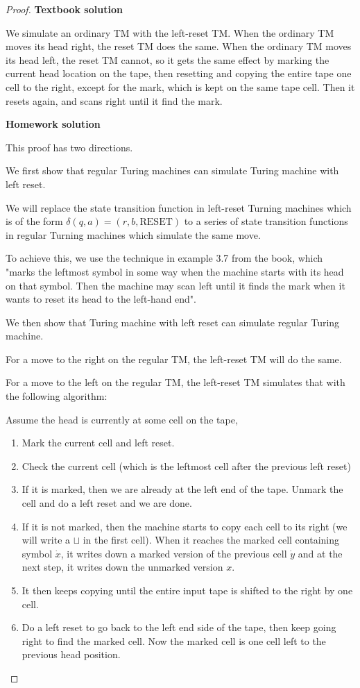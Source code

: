 \begin{mdframed}
\begin{proof}
\textbf{Textbook solution}

We simulate an ordinary TM with the left-reset TM. When the ordinary TM moves its head right, the reset TM does the same. When the ordinary TM moves its head left, the reset TM cannot, so it gets the same effect by marking the current head location on the tape, then resetting and copying the entire tape one cell to the right, except for the mark, which is kept on the same tape cell. Then it resets again, and scans right until it find the mark.

\textbf{Homework solution}

This proof has two directions.

\medskip
We first show that regular Turing machines can simulate Turing machine with left reset.

We will replace the state transition function in left-reset Turning machines which is of the form 
$\delta(q, a) = (r, b, \text{RESET})$ to a series of state transition functions in regular Turning machines which simulate the same move.

To achieve this, we use the technique in example 3.7 from the book, which "marks the leftmost symbol in some way when the machine starts with its head on that symbol. Then the machine may scan
left until it finds the mark when it wants to reset its head to the left-hand end".

\medskip
We then show that Turing machine with left reset can simulate regular Turing machine.

For a move to the right on the regular TM, the left-reset TM will do the same.

For a move to the left on the regular TM, the left-reset TM simulates that with the following algorithm:

Assume the head is currently at some cell on the tape,
\begin{enumerate}
\item Mark the current cell and left reset.
\item Check the current cell (which is the leftmost cell after the previous left reset)
\item If it is marked, then we are already at the left end of the tape. Unmark the cell and do a left reset and we are done.
\item If it is not marked, then the machine starts to copy each cell to its right (we will write a $\sqcup$ in the first cell). When it reaches the marked cell containing symbol $\dot{x}$, it writes down a marked version of the previous cell $\dot{y}$ and at the next step, it writes down the unmarked version $x$. 
\item It then keeps copying until the entire input tape is shifted to the right by one cell. 
\item Do a left reset to go back to the left end side of the tape, then keep going right to find the marked cell. Now the marked cell is one cell left to the previous head position.
\end{enumerate}
\end{proof}
\end{mdframed}

